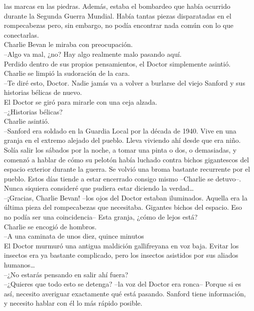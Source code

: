 las marcas en las piedras. Además, estaba el bombardeo que había
ocurrido durante la Segunda Guerra Mundial. Había tantas piezas
disparatadas en el rompecabezas pero, sin embargo, no podía encontrar
nada común con lo que conectarlas.\\
Charlie Bevan le miraba con preocupación.\\
--Algo va mal, ¿no? Hay algo realmente malo pasando aquí.\\
Perdido dentro de sus propios pensamientos, el Doctor simplemente
asintió.\\
Charlie se limpió la sudoración de la cara.\\
--Te diré esto, Doctor. Nadie jamás va a volver a burlarse del viejo
Sanford y sus historias bélicas de nuevo.\\
El Doctor se giró para mirarle con una ceja alzada.\\
--¿Historias bélicas?\\
Charlie asintió.\\
--Sanford era soldado en la Guardia Local por la década de 1940. Vive en
una granja en el extremo alejado del pueblo. Lleva viviendo ahí desde
que era niño. Solía salir los sábados por la noche, a tomar una pinta o
dos, o demasiadas, y comenzó a hablar de cómo su pelotón había luchado
contra bichos gigantescos del espacio exterior durante la guerra. Se
volvió una broma bastante recurrente por el pueblo. Estos días tiende a
estar encerrado consigo mismo --Charlie se detuvo--. Nunca siquiera
consideré que pudiera estar diciendo la verdad\ldots{}\\
--¡Gracias, Charlie Bevan! --los ojos del Doctor estaban iluminados.
Aquella era la última pieza del rompecabezas que necesitaba. Gigantes
bichos del espacio. Eso no podía ser una coincidencia-- Esta granja,
¿cómo de lejos está?\\
Charlie se encogió de hombros.\\
--A una caminata de unos diez, quince minutos\\
El Doctor murmuró una antigua maldición gallifreyana en voz baja. Evitar
los insectos era ya bastante complicado, pero los insectos asistidos por
sus aliados humanos\ldots{}\\
--¿No estarás pensando en salir ahí fuera?\\
--¿Quieres que todo esto se detenga? --la voz del Doctor era ronca--
Porque si es así, necesito averiguar exactamente qué está pasando.
Sanford tiene información, y necesito hablar con él lo más rápido
posible.\\
